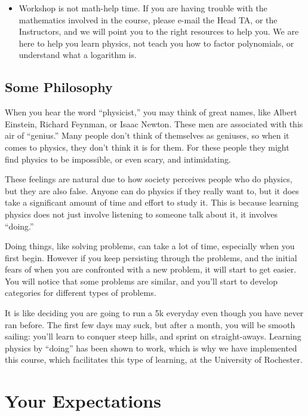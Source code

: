 \documentclass[12pt]{article}
\begin{document}
\begin{itemize}
	\item Workshop is not math-help time. If you are having trouble with the mathematics involved in the course, please e-mail the Head TA, or the Instructors, and we will point you to the right resources to help you. We are here to help you learn physics, not teach you how to factor polynomials, or understand what a logarithm is.
\end{itemize}

\setlength{\headheight}{15pt}

\subsection{Some Philosophy}

When you hear the word ``physicist,'' you may think of great names, like Albert Einstein, Richard Feynman, or Isaac Newton. These men are associated with this air of ``genius.'' Many people don't think of themselves as geniuses, so when it comes to physics, they don't think it is for them. For these people they might find physics to be impossible, or even scary, and intimidating.

These feelings are natural due to how society perceives people who do physics, but they are also false. Anyone can do physics if they really want to, but it does take a significant amount of time and effort to study it. This is because learning physics does not just involve listening to someone talk about it, it involves ``doing.'' 

Doing things, like solving problems, can take a lot of time, especially when you first begin. However if you keep persisting through the problems, and the initial fears of when you are confronted with a new problem, it will start to get easier. You will notice that some problems are similar, and you'll start to develop categories for different types of problems. 

It is like deciding you are going to run a 5k everyday even though you have never ran before. The first few days may suck, but after a month, you will be smooth sailing: you'll learn to conquer steep hills, and sprint on straight-aways. Learning physics by ``doing'' has been shown to work, which is why we have implemented this course, which facilitates this type of learning, at the University of Rochester.

\section{Your Expectations} \label{sec:ye}
\end{document}
